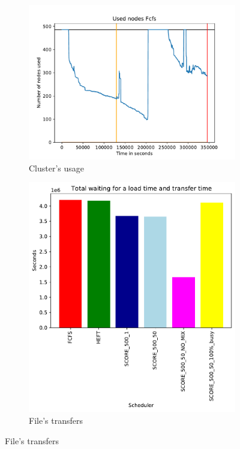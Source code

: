 \documentclass[a4paper]{article}
\begin{document}
\begin{figure}[H]\centering
\begin{subfigure}[b]{0.4\linewidth}\centering\includegraphics[width=1\linewidth]{MBSS/plot/2022-04-07->2022-04-09_V9271_Fcfs_Used_nodes_450_128_32_256_4_1024.pdf}\caption{Cluster's usage}\end{subfigure}
\begin{subfigure}[b]{0.4\linewidth}\centering\includegraphics[width=0.9\linewidth]{MBSS/plot/Results_FCFS_Score_Adaptative_Multiplier_2022-04-07->2022-04-09_V9271_Total_waiting_for_a_load_time_and_transfer_time_450_128_32_256_4_1024.pdf}\caption{File's transfers}\end{subfigure}

\end{figure}
\end{document}
